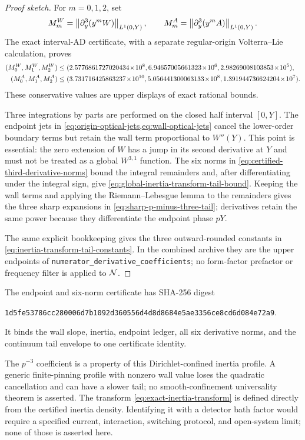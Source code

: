 \begin{proof}[Proof sketch]
For $m=0,1,2$, set
\begin{equation}
 M_m^W=\left\lVert\partial_y^3(y^mW)\right\rVert_{L^1(0,Y)},
 \qquad
 M_m^A=\left\lVert\partial_y^3(y^mA)\right\rVert_{L^1(0,Y)}.
 \label{eq:third-derivative-norms}
\end{equation}
The exact interval-AD certificate, with a separate regular-origin Volterra--Lie
calculation, proves
\begin{align}
 (M_0^W,M_1^W,M_2^W)
 &\leq(2.5776861727020434\!\times\!10^8,
       6.94657005661323\!\times\!10^6,
       2.98269008103853\!\times\!10^5),
 \notag\\
 (M_0^A,M_1^A,M_2^A)
 &\leq(3.731716425863237\!\times\!10^{10},
       5.056441300063133\!\times\!10^8,
       1.391944736624204\!\times\!10^7).
 \label{eq:certified-third-derivative-norms}
\end{align}
These conservative values are upper displays of exact rational bounds.

Three integrations by parts are performed on the closed half interval
$[0,Y]$.  The endpoint jets in
\cref{eq:origin-optical-jets,eq:wall-optical-jets} cancel the lower-order
boundary terms but retain the wall term proportional to $W''(Y)$.  This point
is essential: the zero extension of $W$ has a jump in its second derivative at
$Y$ and must not be treated as a global $W^{3,1}$ function.  The six norms in
\cref{eq:certified-third-derivative-norms} bound the integral remainders and,
after differentiating under the integral sign, give
\cref{eq:global-inertia-transform-tail-bound}.  Keeping the wall terms and
applying the Riemann--Lebesgue lemma to the remainders gives the three sharp
expansions in \cref{eq:sharp-p-minus-three-tail}; derivatives retain the same
power because they differentiate the endpoint phase $pY$.

The same explicit bookkeeping gives the three outward-rounded constants in
\cref{eq:inertia-transform-tail-constants}.  In the combined archive they are
the upper endpoints of
\texttt{numerator\_derivative\_coefficients}; no form-factor prefactor or
frequency filter is applied to \(\mathcal N\).
\end{proof}

The endpoint and six-norm certificate has SHA-256 digest
\begin{center}
\small\nolinkurl{1d5fe53786cc280006d7b1092d360556d4d8d8684e5ae3356ce8cd6d084e72a9}.
\end{center}
It binds the wall slope, inertia, endpoint ledger, all six derivative norms,
and the continuum tail envelope to one certificate identity.

\begin{remark}
The $p^{-3}$ coefficient is a property of this Dirichlet-confined inertia
profile.  A generic finite-pinning profile with nonzero wall value loses the quadratic
cancellation and can have a slower tail; no smooth-confinement universality
theorem is asserted.  The transform \eqref{eq:exact-inertia-transform} is defined
directly from the certified inertia density.  Identifying it with a detector
bath factor would require a specified current, interaction, switching
protocol, and open-system limit; none of those is asserted here.
\end{remark}
